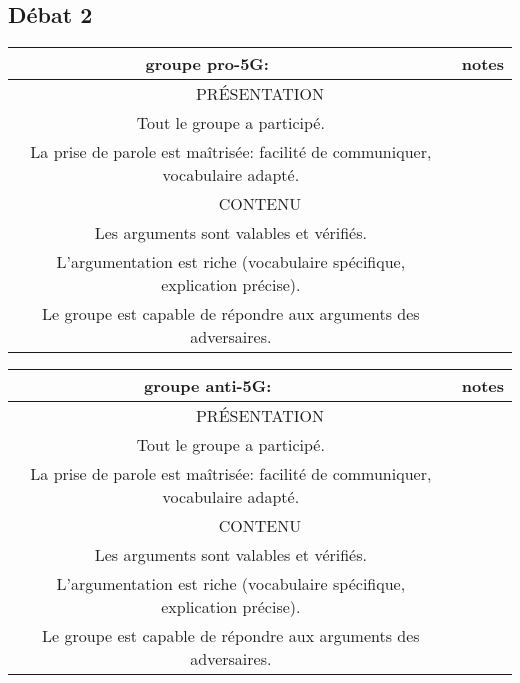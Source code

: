 \documentclass[a4paper,11pt]{article}
\begin{document}
\begin{Form}
\section*{Débat 2}
\begin{center}
\begin{tabular}{|c|p{10cm}|c|}
\hline 
groupe pro-5G: &  & notes \\ 
\hline 
\multicolumn{3}{|c|}{PRÉSENTATION}   \\ 
\hline 
\multicolumn{2}{|c|}{Tout le groupe a participé.} &  \\
\hline 
\multicolumn{2}{|c|}{La prise de parole est maîtrisée: facilité de communiquer, vocabulaire adapté.} &  \\
\hline 
\multicolumn{3}{|c|}{CONTENU}   \\ 
\hline 
\multicolumn{2}{|c|}{Les arguments sont valables et vérifiés.} &  \\
\hline 
\multicolumn{2}{|c|}{L’argumentation est riche (vocabulaire spécifique, explication précise).} &  \\ 
\hline 
\multicolumn{2}{|c|}{Le groupe est capable de répondre aux arguments des adversaires.} &  \\ 
\hline 
\end{tabular}
\end{center}

\begin{center}
\begin{tabular}{|c|p{10cm}|c|}
\hline 
groupe anti-5G: &  & notes \\ 
\hline 
\multicolumn{3}{|c|}{PRÉSENTATION}   \\ 
\hline 
\multicolumn{2}{|c|}{Tout le groupe a participé.} &  \\
\hline 
\multicolumn{2}{|c|}{La prise de parole est maîtrisée: facilité de communiquer, vocabulaire adapté.} &  \\
\hline 
\multicolumn{3}{|c|}{CONTENU}   \\ 
\hline 
\multicolumn{2}{|c|}{Les arguments sont valables et vérifiés.} &  \\
\hline 
\multicolumn{2}{|c|}{L’argumentation est riche (vocabulaire spécifique, explication précise).} &  \\ 
\hline 
\multicolumn{2}{|c|}{Le groupe est capable de répondre aux arguments des adversaires.} &  \\ 
\hline 
\end{tabular}
\end{center}
\end{Form}
\end{document}
